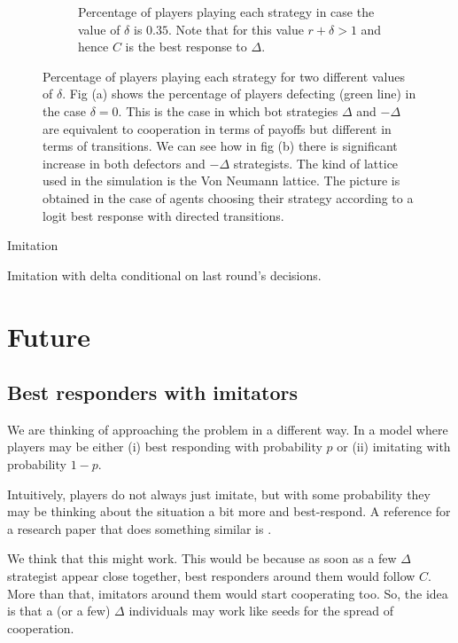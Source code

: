 \documentclass{article}
\begin{document}
\begin{figure}[htbp]
\begin{subfigure}[t]{0.47\textwidth}
  \caption{Percentage of players playing each strategy in case the value of $\delta$ is $0.35$. Note that for this value $r+\delta >1$ and hence $C$ is the best response to $\Delta$.}
  \label{fig:4strat_delta} 
\end{subfigure}
\caption{Percentage of players playing each strategy for two different values of $\delta$.
Fig (a) shows the percentage of players defecting (green line) in the case $\delta =0$. This is the case in which bot strategies $\Delta$ and $-\Delta$ are equivalent to cooperation in terms of payoffs but different in terms of transitions.
We can see how in fig (b) there is significant increase in both defectors and $-\Delta$ strategists.
The kind of lattice used in the simulation is the Von Neumann lattice.
The picture is obtained in the case of agents choosing their strategy according to a logit best response with directed transitions.
}
\label{fig:4strat}
\end{figure} 

Imitation

Imitation with delta conditional on last round's decisions.

\section{Future}

\subsection{Best responders with imitators}
We are thinking of approaching the problem in a different way. In a model where players may be either (i) best responding with probability $p$ or (ii) imitating with probability $1-p$. 

Intuitively, players do not always just imitate, but with some probability they may be thinking about the situation a bit more and best-respond. A reference for a research paper that does something similar is \citet{DziubinskiRoy2012}.

We think that this might work. This would be because as soon as a few $\Delta$ strategist appear close together, best responders around them would follow $C$. More than that, imitators around them would start cooperating too. So, the idea is that a (or a few) $\Delta$ individuals may work like seeds for the spread of cooperation.



\end{document}
